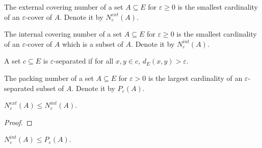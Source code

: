 \begin{definition}\label{def:externalCoveringNumber}
  \mathlibok
  The external covering number of a set $A \subseteq E$ for $\varepsilon \ge 0$ is the smallest cardinality of an $\varepsilon$-cover of $A$.
  Denote it by $N^{ext}_\varepsilon(A)$.
\end{definition}


\begin{definition}\label{def:internalCoveringNumber}
  \mathlibok
  The internal covering number of a set $A \subseteq E$ for $\varepsilon \ge 0$ is the smallest cardinality of an $\varepsilon$-cover of $A$ which is a subset of $A$.
  Denote it by $N^{int}_\varepsilon(A)$.
\end{definition}


\begin{definition}\label{def:IsSeparated}
  \mathlibok
A set $c \subseteq E$ is $\varepsilon$-separated if for all $x, y \in c$, $d_E(x, y) > \varepsilon$.
\end{definition}


\begin{definition}\label{def:packingNumber}
  \mathlibok
The packing number of a set $A \subseteq E$ for $\varepsilon > 0$ is the largest cardinality of an $\varepsilon$-separated subset of $A$.
Denote it by $P_\varepsilon(A)$.
\end{definition}


\begin{lemma}\label{lem:externalCoveringNumber_le_internalCoveringNumber}
  \mathlibok
$N^{ext}_\varepsilon(A) \le N^{int}_\varepsilon(A)$.
\end{lemma}

\begin{proof}
\end{proof}


\begin{lemma}\label{lem:internalCoveringNumber_le_packingNumber}
  \mathlibok
$N^{int}_\varepsilon(A) \le P_\varepsilon(A)$.
\end{lemma}

